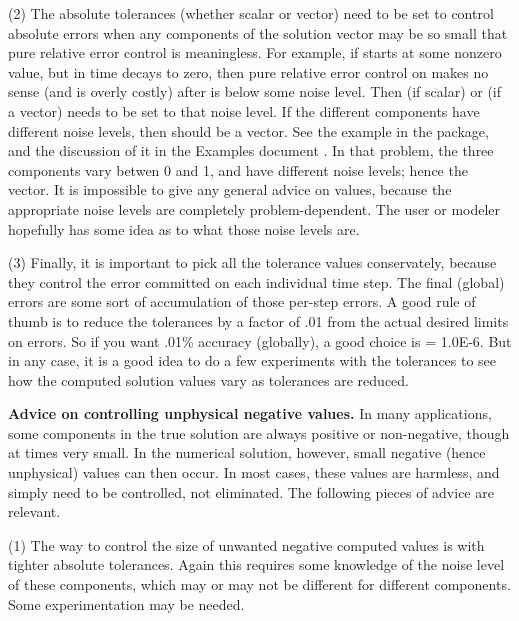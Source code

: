(2) The absolute tolerances  (whether scalar or vector) need to
be set to control absolute errors when any components of the solution
vector  may be so small that pure relative error control is
meaningless.  For example, if  starts at some nonzero value, but in time
decays to zero, then pure relative error control on  makes no sense
(and is overly costly) after  is below some noise level.  Then
 (if scalar) or  (if a vector) needs to be set to that
noise level.  If the different components have different noise levels,
then  should be a vector.  See the example  in the
{\ida} package, and the discussion of it in the {\ida} Examples document
\cite{ida2.4.0_ex}.
In that problem, the three components vary betwen 0 and 1, and have
different noise levels; hence the  vector.  It is impossible to
give any general advice on  values, because the appropriate noise
levels are completely problem-dependent.  The user or modeler hopefully has
some idea as to what those noise levels are.

(3) Finally, it is important to pick all the tolerance values conservately,
because they control the error committed on each individual time step.
The final (global) errors are some sort of accumulation of those
per-step errors.  A good rule of thumb is to reduce the tolerances by a
factor of .01 from the actual desired limits on errors.  So if you
want .01\% accuracy (globally), a good choice is  = 1.0E-6.
But in any case, it is a good idea to do a few experiments with
the tolerances to see how the computed solution values vary as
tolerances are reduced.

\vspace{0.1in}
{\bf Advice on controlling unphysical negative values.}
In many applications, some components in the true solution are always
positive or non-negative, though at times very small.  In the numerical
solution, however, small negative (hence unphysical) values can then
occur.  In most cases, these values are harmless, and simply need to
be controlled, not eliminated. The following pieces of advice are relevant.

(1) The way to control the size of unwanted negative computed values
is with tighter absolute tolerances.  Again this requires some
knowledge of the noise level of these components, which may or may not
be different for different components.  Some experimentation may be
needed.

